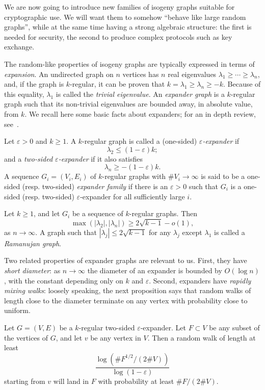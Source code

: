 \documentclass[b5layout]{hdr}
\begin{document}
We are now going to introduce new families of isogeny graphs suitable
for cryptographic use. %
We will want them to somehow ``behave like large random graphs'',
while at the same time having a strong algebraic structure: the first
is needed for security, the second to produce complex protocols such
as key exchange. %

The random-like properties of isogeny graphs are typically expressed
in terms of \emph{expansion}. %
An undirected graph on $n$ vertices has $n$ real eigenvalues
$λ_1≥\cdots≥λ_n$, and, if the graph is $k$-regular, it can be proven
that $k=λ_1≥λ_n≥-k$. %
Because of this equality, $λ_1$ is called the \emph{trivial
  eigenvalue}. %
An \emph{expander graph} is a $k$-regular graph such that its
non-trivial eigenvalues are bounded away, in absolute value, from
$k$. %
We recall here some basic facts about expanders; for an in depth
review, see~\cite{Goldreich2011,tao2011expander}.

\begin{definition}
  Let $ε>0$ and $k≥1$. A $k$-regular graph is called a (one-sided)
  \emph{$ε$-expander} if
  \[λ_2≤(1-ε)k;\]
  and a \emph{two-sided $ε$-expander} if it also satisfies
  \[λ_n≥-(1-ε)k.\] %
  A sequence $G_i=(V_i,E_i)$ of $k$-regular graphs with $\#V_i→∞$ is
  said to be a one-sided (resp. two-sided) \emph{expander family} if
  there is an $ε>0$ such that $G_i$ is a one-sided (resp. two-sided)
  $ε$-expander for all sufficiently large $i$.
\end{definition}

\begin{theorem}
  Let $k≥1$, and let $G_i$ be a sequence of $k$-regular graphs. %
  Then
  \[\max(|λ_2|,|λ_n|) ≥ 2\sqrt{k-1} - o(1),\]
  as $n→∞$. %
  A graph such that $|λ_j|≤2\sqrt{k-1}$ for any $λ_j$ except $λ_1$ is
  called a \emph{Ramanujan graph}.
\end{theorem}

Two related properties of expander graphs are relevant to us. %
First, they have \emph{short diameter}: as $n→∞$ the diameter of an
expander is bounded by $O(\log n)$, with the constant depending only
on $k$ and $ε$. %
Second, expanders have \emph{rapidly mixing walks}: loosely speaking,
the next proposition says that random walks of length close to the
diameter terminate on any vertex with probability close to uniform. %

\begin{proposition}
  Let $G=(V,E)$ be a $k$-regular two-sided $ε$-expander. %
  Let $F⊂V$ be any subset of the vertices of $G$, and let $v$ be any
  vertex in $V$. %
  Then a random walk of length at least
  \[\frac{\log(\#F^{1/2}/(2\#V))}{\log(1-ε)}\] %
  starting from $v$ will land in $F$ with probability at least
  $\#F/(2\#V)$.
\end{proposition}
\end{document}
